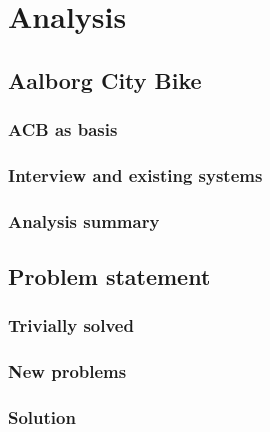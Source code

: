 \section{Analysis}

\subsection{Aalborg City Bike}

\begin{frame}
\frametitle{ACB as basis}

\end{frame}

\begin{frame}
\frametitle{Interview and existing systems}

\end{frame}

\begin{frame}
\frametitle{Analysis summary}

\end{frame}

\subsection{Problem statement}

\begin{frame}
\frametitle{Trivially solved}

\end{frame}

\begin{frame}
\frametitle{New problems}

\end{frame}

\begin{frame}
\frametitle{Solution}

\end{frame}
